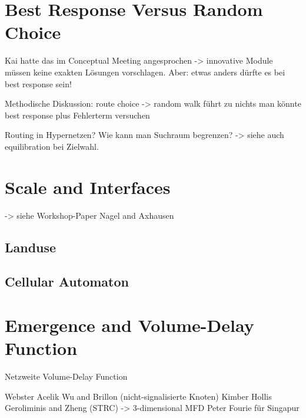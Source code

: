 
\section{Best Response Versus Random Choice}
\label{sec:bestResponseOrRandom}
Kai hatte das im Conceptual Meeting angesprochen -> innovative Module müssen keine exakten Lösungen vorschlagen. 
Aber: etwas anders dürfte es bei best response sein!


Methodische Diskussion:
route choice -> random walk führt zu nichts
man könnte best response plus Fehlerterm versuchen

Routing in Hypernetzen?
Wie kann man Suchraum begrenzen? -> siehe auch equilibration bei Zielwahl.




\section{Scale and Interfaces}
-> siehe Workshop-Paper Nagel and Axhausen

\subsection{Landuse}

\subsection{Cellular Automaton}

\section{Emergence and Volume-Delay Function}
Netzweite Volume-Delay Function

Webster
Acelik
Wu and Brillon (nicht-signalisierte Knoten)
Kimber Hollis
Geroliminis and Zheng (STRC) -> 3-dimensional MFD
Peter Fourie für Singapur

